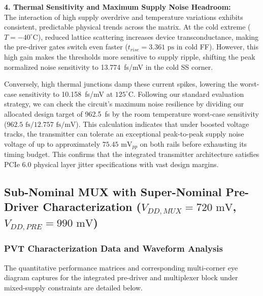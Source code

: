 \textbf{4. Thermal Sensitivity and Maximum Supply Noise Headroom:} \\
The interaction of high supply overdrive and temperature variations exhibits consistent, predictable physical trends across the matrix. At the cold extreme ($T = -40^{\circ}\text{C}$), reduced lattice scattering increases device transconductance, making the pre-driver gates switch even faster ($t_{rise} = 3.361\text{ ps}$ in cold FF). However, this high gain makes the thresholds more sensitive to supply ripple, shifting the peak normalized noise sensitivity to 13.774~fs/mV in the cold SS corner. 

Conversely, high thermal junctions damp these current spikes, lowering the worst-case sensitivity to 10.158~fs/mV at $125^{\circ}\text{C}$. Following our standard evaluation strategy, we can check the circuit's maximum noise resilience by dividing our allocated design target of 962.5~fs by the room temperature worst-case sensitivity ($962.5\text{ fs} / 12.757\text{ fs/mV}$). This calculation indicates that under boosted voltage tracks, the transmitter can tolerate an exceptional peak-to-peak supply noise voltage of up to approximately $75.45\text{ mV}_{pp}$ on both rails before exhausting its timing budget. This confirms that the integrated transmitter architecture satisfies PCIe 6.0 physical layer jitter specifications with vast design margins.
\clearpage
\subsection*{Sub-Nominal MUX with Super-Nominal Pre-Driver Characterization ($V_{DD,MUX} = 720\text{ mV}$, $V_{DD,PRE} = 990\text{ mV}$)}
\subsubsection*{PVT Characterization Data and Waveform Analysis}

The quantitative performance matrices and corresponding multi-corner eye diagram captures for the integrated pre-driver and multiplexer block under mixed-supply constraints are detailed below.

